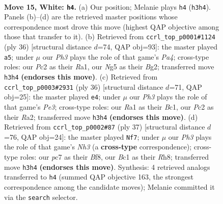 \documentclass[11pt]{article}
\begin{document}
\begin{figure}[p]
\label{fig:thought-m26}
\end{figure}

\clearpage

\begin{figure}[p]\centering
\begin{subfigure}{0.46\textwidth}\centering
\resizebox{\linewidth}{!}{%
\newchessgame
\chessboard[
  setfen={r1b2rk1/2p2p2/5np1/p1pqp1Np/8/2PP2PP/P1P1QP2/R1B2RK1 w - - 0 15},
  showmover=false,
  pgfstyle=straightmove, color=movearrow, markmove={h3-h4}
]}
\caption{}
\end{subfigure}\hfill
\begin{subfigure}{0.46\textwidth}\centering
\resizebox{\linewidth}{!}{%
\newchessgame
\chessboard[
  setfen={3rr1k1/1p2npp1/pq3b1p/3p4/P1pP1P2/2N1P1P1/1P2Q1BP/R3R1K1 w - - 5 19},
  showmover=false,
  pgfstyle=straightmove, color=movearrow, markmove={a4-a5}
]}
\caption{}
\end{subfigure}
\\[4pt]
\begin{subfigure}{0.46\textwidth}\centering
\resizebox{\linewidth}{!}{%
\newchessgame
\chessboard[
  setfen={r3r1k1/1p1n1ppp/p2q4/n2p2P1/3P1N1P/P2QPP2/R7/2B2RK1 w - - 1 19},
  showmover=false,
  pgfstyle=straightmove, color=movearrow, markmove={e3-e4}
]}
\caption{}
\end{subfigure}\hfill
\begin{subfigure}{0.46\textwidth}\centering
\resizebox{\linewidth}{!}{%
\newchessgame
\chessboard[
  setfen={2k1rb1r/1pp5/p1p1qp1n/6p1/2N1P2p/2Q4P/PPP2PPB/R3R2K b - - 1 19},
  showmover=false,
  pgfstyle=straightmove, color=movearrow, markmove={h6-f7}
]}
\caption{}
\end{subfigure}
\caption{\textbf{Move 15, White: \texttt{h4}.} (a) Our position; Melanie plays \texttt{h4} (\texttt{h3h4}). Panels (b)--(d) are the retrieved master positions whose correspondence most drove this move (highest QAP objective among those that transfer to it). (b) Retrieved from \texttt{ccrl\_top\_p0001\#1124} (ply 36) [structural distance $d$=74, QAP obj=93]: the master played \texttt{a5}; under $\mu$ our \emph{Ph3} plays the role of that game's \emph{Pa4}; cross-type roles: our \emph{P}c2 as their \emph{R}a1, our \emph{N}g5 as their \emph{B}g2; transferred move \texttt{h3h4} \textbf{(endorses this move)}. (c) Retrieved from \texttt{ccrl\_top\_p0003\#2931} (ply 36) [structural distance $d$=71, QAP obj=25]: the master played \texttt{e4}; under $\mu$ our \emph{Ph3} plays the role of that game's \emph{Pe3}; cross-type roles: our \emph{R}a1 as their \emph{B}c1, our \emph{P}c2 as their \emph{R}a2; transferred move \texttt{h3h4} \textbf{(endorses this move)}. (d) Retrieved from \texttt{ccrl\_top\_p0002\#87} (ply 37) [structural distance $d$=76, QAP obj=24]: the master played \texttt{Nf7}; under $\mu$ our \emph{Ph3} plays the role of that game's \emph{Nh3} (a \textbf{cross-type} correspondence); cross-type roles: our \emph{p}c7 as their \emph{B}f8, our \emph{B}c1 as their \emph{R}h8; transferred move \texttt{h3h4} \textbf{(endorses this move)}. Synthesis: 4 retrieved analogs transferred to \texttt{h4} (summed QAP objective 163, the strongest correspondence among the candidate moves); Melanie committed it via the \texttt{search} selector.}

\end{figure}
\end{document}
